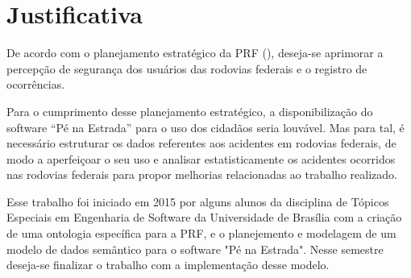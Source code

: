 \section[Justificativa]{Justificativa}

De acordo com o planejamento estratégico da PRF (\cite{prf13}), deseja-se aprimorar a
percepção de segurança dos usuários das rodovias federais e o registro de ocorrências.

Para o cumprimento desse planejamento estratégico, a disponibilização do software
“Pé na Estrada” para o uso dos cidadãos seria louvável. Mas para tal, é necessário
estruturar os dados referentes aos acidentes em rodovias federais, de modo a aperfeiçoar o
seu uso e analisar estatisticamente os acidentes ocorridos nas rodovias federais para
propor melhorias relacionadas ao trabalho realizado.

Esse trabalho foi iniciado em 2015 por alguns alunos da disciplina de Tópicos Especiais em Engenharia de Software da Universidade de Brasília com a criação de uma ontologia específica para a PRF, e o planejemento e modelagem de um modelo de dados semântico para o software "Pé na Estrada". Nesse semestre deseja-se finalizar o trabalho com a implementação desse modelo. 